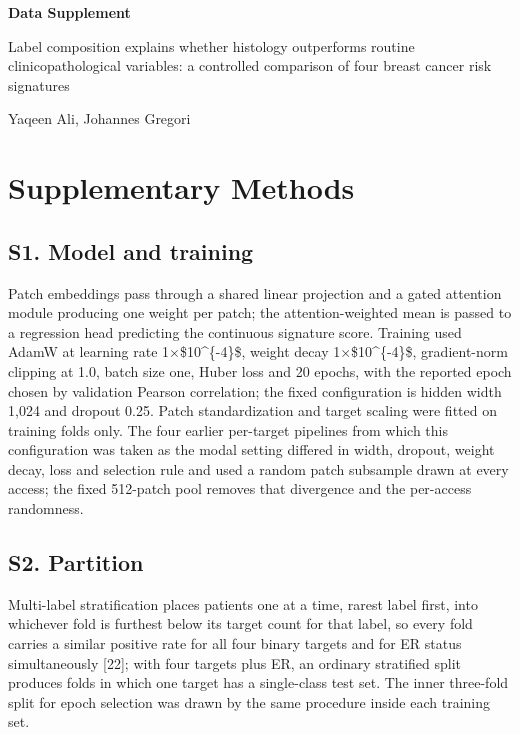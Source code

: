 \documentclass[11pt,a4paper]{article}
\begin{document}
\begin{center}{\Large\bfseries Data Supplement\par}
{\normalsize Label composition explains whether histology outperforms routine clinicopathological variables: a controlled comparison of four breast cancer risk signatures\par}
{\small Yaqeen Ali, Johannes Gregori\par}
\end{center}
\vspace{1em}
\section{Supplementary Methods}
\subsection{S1. Model and training}
Patch embeddings pass through a shared linear projection and a gated attention module producing one weight per patch; the attention-weighted mean is passed to a regression head predicting the continuous signature score. Training used AdamW at learning rate 1$\times$\$10\textasciicircum{}\{-4\}\$, weight decay 1$\times$\$10\textasciicircum{}\{-4\}\$, gradient-norm clipping at 1.0, batch size one, Huber loss and 20 epochs, with the reported epoch chosen by validation Pearson correlation; the fixed configuration is hidden width 1,024 and dropout 0.25. Patch standardization and target scaling were fitted on training folds only. The four earlier per-target pipelines from which this configuration was taken as the modal setting differed in width, dropout, weight decay, loss and selection rule and used a random patch subsample drawn at every access; the fixed 512-patch pool removes that divergence and the per-access randomness.

\subsection{S2. Partition}
Multi-label stratification places patients one at a time, rarest label first, into whichever fold is furthest below its target count for that label, so every fold carries a similar positive rate for all four binary targets and for ER status simultaneously [22]; with four targets plus ER, an ordinary stratified split produces folds in which one target has a single-class test set. The inner three-fold split for epoch selection was drawn by the same procedure inside each training set.
\end{document}
